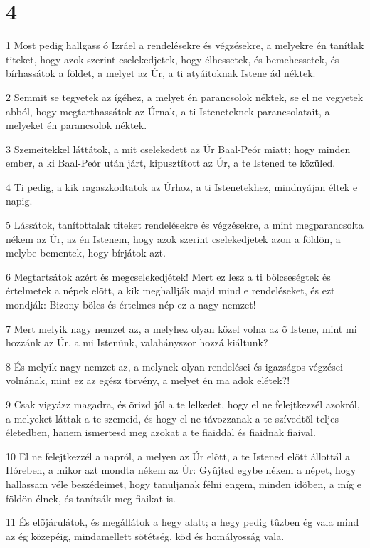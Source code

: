 \chapter{4}

\par 1 Most pedig hallgass ó Izráel a rendelésekre és végzésekre, a melyekre én tanítlak titeket, hogy azok szerint cselekedjetek, hogy élhessetek, és bemehessetek, és bírhassátok a földet, a melyet az Úr, a ti atyáitoknak Istene ád néktek.
\par 2 Semmit se tegyetek az ígéhez, a melyet én parancsolok néktek, se el ne vegyetek abból, hogy megtarthassátok az Úrnak, a ti Isteneteknek parancsolatait, a melyeket én parancsolok néktek.
\par 3 Szemeitekkel láttátok, a mit cselekedett az Úr Baal-Peór miatt; hogy minden ember, a ki Baal-Peór után járt, kipusztított az Úr, a te Istened te közüled.
\par 4 Ti pedig, a kik ragaszkodtatok az Úrhoz, a ti Istenetekhez, mindnyájan éltek e napig.
\par 5 Lássátok, tanítottalak titeket rendelésekre és végzésekre, a mint megparancsolta nékem az Úr, az én Istenem, hogy azok szerint cselekedjetek azon a földön, a melybe bementek, hogy bírjátok azt.
\par 6 Megtartsátok azért és megcselekedjétek! Mert ez lesz a ti bölcseségtek és értelmetek a népek elõtt, a kik meghallják majd mind e rendeléseket, és ezt mondják: Bizony bölcs és értelmes nép ez a nagy nemzet!
\par 7 Mert melyik nagy nemzet az, a melyhez olyan közel volna az õ Istene, mint mi hozzánk az Úr, a mi Istenünk, valahányszor hozzá kiáltunk?
\par 8 És melyik nagy nemzet az, a melynek olyan rendelései és igazságos végzései volnának, mint ez az egész törvény, a melyet én ma adok elétek?!
\par 9 Csak vigyázz magadra, és õrizd jól a te lelkedet, hogy el ne felejtkezzél azokról, a melyeket láttak a te szemeid, és hogy el ne távozzanak a te szívedtõl teljes életedben, hanem ismertesd meg azokat a te fiaiddal és fiaidnak  fiaival.
\par 10 El ne felejtkezzél a napról, a melyen az Úr elõtt, a te Istened elõtt állottál a Hóreben, a mikor azt mondta nékem az Úr: Gyûjtsd egybe nékem a népet, hogy hallassam véle beszédeimet, hogy tanuljanak félni engem, minden idõben, a míg e földön élnek, és tanítsák meg fiaikat is.
\par 11 És elõjárulátok, és megállátok a hegy alatt; a hegy pedig tûzben ég vala mind az ég közepéig, mindamellett sötétség, köd és homályosság vala.
